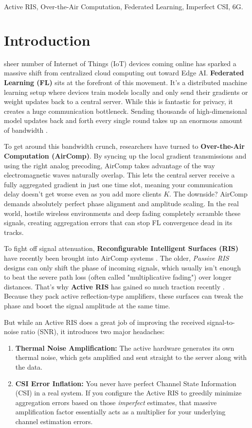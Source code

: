 \documentclass[lettersize,journal]{IEEEtran}
\begin{document}
\begin{IEEEkeywords}
Active RIS, Over-the-Air Computation, Federated Learning, Imperfect CSI, 6G.
\end{IEEEkeywords}

\section{Introduction}
 sheer number of Internet of Things (IoT) devices coming online has sparked a massive shift from centralized cloud computing out toward Edge AI. \textbf{Federated Learning (FL)} sits at the forefront of this movement. It's a distributed machine learning setup where devices train models locally and only send their gradients or weight updates back to a central server. While this is fantastic for privacy, it creates a huge communication bottleneck. Sending thousands of high-dimensional model updates back and forth every single round takes up an enormous amount of bandwidth \cite{zhu2020broadband, yang2020federated}.

To get around this bandwidth crunch, researchers have turned to \textbf{Over-the-Air Computation (AirComp)}. By syncing up the local gradient transmissions and using the right analog precoding, AirComp takes advantage of the way electromagnetic waves naturally overlap. This lets the central server receive a fully aggregated gradient in just one time slot, meaning your communication delay doesn't get worse even as you add more clients $K$. The downside? AirComp demands absolutely perfect phase alignment and amplitude scaling. In the real world, hostile wireless environments and deep fading completely scramble these signals, creating aggregation errors that can stop FL convergence dead in its tracks.

To fight off signal attenuation, \textbf{Reconfigurable Intelligent Surfaces (RIS)} have recently been brought into AirComp systems \cite{ni2021integrating}. The older, \textit{Passive RIS} designs can only shift the phase of incoming signals, which usually isn't enough to beat the severe path loss (often called "multiplicative fading") over longer distances. That's why \textbf{Active RIS} has gained so much traction recently \cite{long2021active, zhi2022active}. Because they pack active reflection-type amplifiers, these surfaces can tweak the phase and boost the signal amplitude at the same time.

But while an Active RIS does a great job of improving the received signal-to-noise ratio (SNR), it introduces two major headaches:
\begin{enumerate}
    \item \textbf{Thermal Noise Amplification:} The active hardware generates its own thermal noise, which gets amplified and sent straight to the server along with the data.
    \item \textbf{CSI Error Inflation:} You never have perfect Channel State Information (CSI) in a real system. If you configure the Active RIS to greedily minimize aggregation errors based on those \textit{imperfect} estimates, that massive amplification factor essentially acts as a multiplier for your underlying channel estimation errors.
\end{enumerate}
\end{document}
